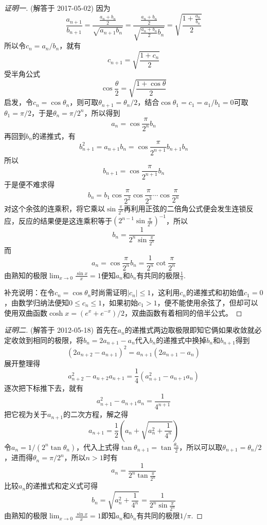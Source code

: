 \begin{proof}[证明一]
  (解答于 2017-05-02)
  因为
\[ \frac{a_{n+1}}{b_{n+1}}=\frac{\frac{a_n+b_n}{2}}{\sqrt{a_{n+1}b_n}} = \frac{\frac{a_n+b_n}{2}}{\sqrt{\frac{a_n+b_n}{2}b_n}} = \sqrt{\frac{1+\frac{a_n}{b_n}}{2}} \]
所以令$c_n=a_n / b_n$，就有
\[ c_{n+1}=\sqrt{\frac{1+c_n}{2}} \]
受半角公式
\[ \cos{\frac{\theta}{2}}=\sqrt{\frac{1+\cos{\theta}}{2}} \]
启发，令$c_n=\cos{\theta_n}$，则可取$\theta_{n+1}=\theta_n / 2$，结合$\cos{\theta_1}=c_1=a_1 / b_1=0$可取$\theta_1=\pi / 2$，于是$\theta_n=\pi / 2^n$，所以得到
\[ a_n=\cos\frac{\pi}{2^n}b_n \]
再回到$b_n$的递推式，有
\[ b_{n+1}^2=a_{n+1}b_n=\cos{\frac{\pi}{2^{n+1}}} b_{n+1}b_n\]
所以
\[ b_{n+1}=\cos{\frac{\pi}{2^{n+1}}} b_n \]
于是便不难求得
\[ b_n=b_1 \cos{\frac{\pi}{2^2}}\cos{\frac{\pi}{2^3}}\cdots \cos{\frac{\pi}{2^n}} \]
对这个余弦的连乘积，将它乘以$\sin{\frac{\pi}{2^n}}$再利用正弦的二倍角公式便会发生连锁反应，反应的结果便是这连乘积等于$\left( 2^{n-1}\sin{\frac{\pi}{2^n}} \right)^{-1}$，所以
\[ b_n=\frac{1}{2^n \sin{\frac{\pi}{2^n}}} \]
而
\[ a_n=\cos{\frac{\pi}{2^n}}b_n=\frac{1}{2^n}\cot{\frac{\pi}{2^n}} \]
由熟知的极限$\lim_{x \to 0} \frac{\sin{x}}{x}=1$便知$a_n$和$b_n$有共同的极限$\frac{1}{\pi}$.

补充说明：在令$c_n=\cos{\theta_n}$时尚需证明$|c_n| \leqslant 1$，这利用$c_n$的递推式和初始值$c_1=0$，由数学归纳法便知$0 \leqslant c_n \leqslant 1$，如果初始$c_1>1$，便不能使用余弦了，但却可以使用双曲函数$\cosh{x}=(e^x+e^{-x})/2$，双曲函数有着相同的倍半公式。
\end{proof}

\begin{proof}[证明二]
  (解答于 2012-05-18)
  首先在$a_n$的递推式两边取极限即知它俩如果收敛就必定收敛到相同的极限，将$b_n=2a_{n+1}-a_n$代入$b_n$的递推式中换掉$b_n$和$b_{n+1}$得到
  \[ (2a_{n+2}-a_{n+1})^{2} = a_{n+1}(2a_{n+1}-a_n) \]
  展开整理得
  \[ a_{n+2}^2-a_{n+2}a_{n+1} = \frac{1}{4}(a_{n+1}^2-a_{n+1}a_n) \]
  逐次把下标推下去，就有
  \[ a_{n+1}^2-a_{n+1}a_n = \frac{1}{4^{n+1}} \]
  把它视为关于$a_{n+1}$的二次方程，解之得
  \[ a_{n+1} = \frac{1}{2} \left( a_n+\sqrt{a_n^2+\frac{1}{4^n}} \right) \]
令$a_n=1/(2^n \tan{\theta_n})$，代入上式得$\tan{\theta_{n+1}}=\tan{\frac{\theta_n}{2}}$，所以可以取$\theta_{n+1}=\theta_n/2$，进而得$\theta_n=\pi / 2^n$，所以$n>1$时有
\[ a_n = \frac{1}{2^n \tan{\frac{\pi}{2^n}}} \]
比较$a_n$的递推式和定义式可得
\[ b_n = \sqrt{a_n^2+\frac{1}{4^n}} = \frac{1}{2^n \sin{\frac{\pi}{2^n}}} \]
由熟知的极限$\lim_{x \rightarrow 0} \frac{\sin{x}}{x}=1$即知$a_n$和$b_n$有共同的极限$1/\pi$.
\end{proof}

